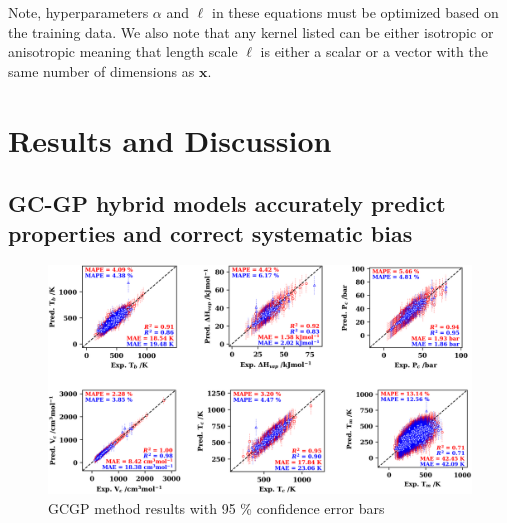 \documentclass[journal=jacsat,manuscript=article]{achemso}
\begin{document}



Note, hyperparameters $\alpha$ and $\ell$ in these equations must be optimized based on the training data. We also note that any kernel listed can be either isotropic or anisotropic meaning that length scale $\ell$ is either a scalar or a vector with the same number of dimensions as $\mathbf{x}$.



\section{Results and Discussion}

\subsection{GC-GP hybrid models accurately predict properties and correct systematic bias}

\begin{figure}[H]
    \centering
    \includegraphics[width=1\linewidth]{images/2D_GCGP_pred_results_SI.png}
    \caption{GCGP method results with 95 \% confidence error bars}
    \label{fig:GCGP_with_error_bars}
\end{figure}
\end{document}
